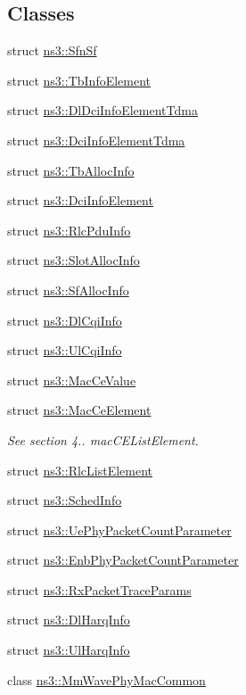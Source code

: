 \subsection*{Classes}
\begin{DoxyCompactItemize}
\item 
struct \hyperlink{structns3_1_1SfnSf}{ns3\+::\+Sfn\+Sf}
\item 
struct \hyperlink{structns3_1_1TbInfoElement}{ns3\+::\+Tb\+Info\+Element}
\item 
struct \hyperlink{structns3_1_1DlDciInfoElementTdma}{ns3\+::\+Dl\+Dci\+Info\+Element\+Tdma}
\item 
struct \hyperlink{structns3_1_1DciInfoElementTdma}{ns3\+::\+Dci\+Info\+Element\+Tdma}
\item 
struct \hyperlink{structns3_1_1TbAllocInfo}{ns3\+::\+Tb\+Alloc\+Info}
\item 
struct \hyperlink{structns3_1_1DciInfoElement}{ns3\+::\+Dci\+Info\+Element}
\item 
struct \hyperlink{structns3_1_1RlcPduInfo}{ns3\+::\+Rlc\+Pdu\+Info}
\item 
struct \hyperlink{structns3_1_1SlotAllocInfo}{ns3\+::\+Slot\+Alloc\+Info}
\item 
struct \hyperlink{structns3_1_1SfAllocInfo}{ns3\+::\+Sf\+Alloc\+Info}
\item 
struct \hyperlink{structns3_1_1DlCqiInfo}{ns3\+::\+Dl\+Cqi\+Info}
\item 
struct \hyperlink{structns3_1_1UlCqiInfo}{ns3\+::\+Ul\+Cqi\+Info}
\item 
struct \hyperlink{structns3_1_1MacCeValue}{ns3\+::\+Mac\+Ce\+Value}
\item 
struct \hyperlink{structns3_1_1MacCeElement}{ns3\+::\+Mac\+Ce\+Element}
\begin{DoxyCompactList}\small\item\em See section 4.. mac\+C\+E\+List\+Element. \end{DoxyCompactList}\item 
struct \hyperlink{structns3_1_1RlcListElement}{ns3\+::\+Rlc\+List\+Element}
\item 
struct \hyperlink{structns3_1_1SchedInfo}{ns3\+::\+Sched\+Info}
\item 
struct \hyperlink{structns3_1_1UePhyPacketCountParameter}{ns3\+::\+Ue\+Phy\+Packet\+Count\+Parameter}
\item 
struct \hyperlink{structns3_1_1EnbPhyPacketCountParameter}{ns3\+::\+Enb\+Phy\+Packet\+Count\+Parameter}
\item 
struct \hyperlink{structns3_1_1RxPacketTraceParams}{ns3\+::\+Rx\+Packet\+Trace\+Params}
\item 
struct \hyperlink{structns3_1_1DlHarqInfo}{ns3\+::\+Dl\+Harq\+Info}
\item 
struct \hyperlink{structns3_1_1UlHarqInfo}{ns3\+::\+Ul\+Harq\+Info}
\item 
class \hyperlink{classns3_1_1MmWavePhyMacCommon}{ns3\+::\+Mm\+Wave\+Phy\+Mac\+Common}
\end{DoxyCompactItemize}
